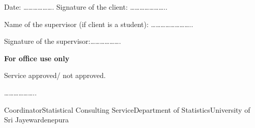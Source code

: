 \documentclass[
  a4paper]{article}
\begin{document}
\vspace{0.5cm}

Date: \ldots\ldots\ldots\ldots\ldots\ldots. \hspace{2cm} Signature of
the client: \ldots\ldots\ldots\ldots\ldots\ldots\ldots..

\vspace{1cm}

Name of the supervisor (if client is a student):
\ldots\ldots\ldots\ldots\ldots\ldots\ldots\ldots..

\vspace{0.5cm}

Signature of the supervisor:\ldots\ldots\ldots\ldots\ldots\ldots.

\noindent\makebox[\linewidth]{\rule{\paperwidth}{0.4pt}}

\textbf{For office use only}

Service approved/ not approved.

\hspace{2cm}

\ldots\ldots\ldots\ldots\ldots\ldots..

Coordinator\newline Statistical Consulting Service\newline Department of
Statistics\newline University of Sri Jayewardenepura
\end{document}
